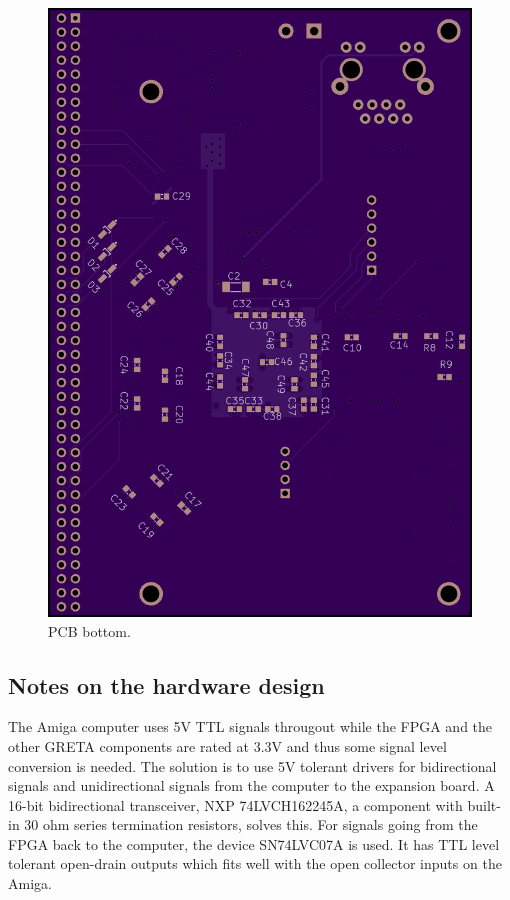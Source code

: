 \documentclass[a4paper]{report}
\begin{document}
\begin{figure}
\centering
\includegraphics[width=\textwidth]{greta_1_00_bottom.png}
\caption{PCB bottom.}
\label{greta_osh_bottom}
\end{figure}
\subsection{Notes on the hardware design}
The Amiga computer uses 5V TTL signals througout while the FPGA
and the other GRETA components are rated at 3.3V and thus some
signal level conversion is needed. The solution is to use 5V
tolerant drivers for bidirectional signals and unidirectional
signals from the computer to the expansion board. A 16-bit
bidirectional transceiver, NXP 74LVCH162245A, a component with
built-in 30 ohm series termination resistors, solves this. For
signals going from the FPGA back to the computer, the device
SN74LVC07A is used. It has TTL level tolerant open-drain outputs
which fits well with the open collector inputs on the Amiga.
\end{document}
